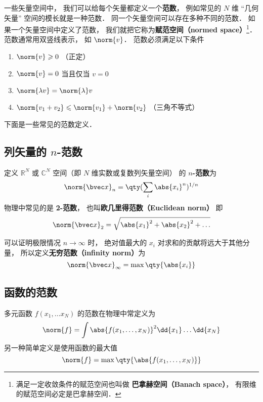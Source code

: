 

一些矢量空间中， 我们可以给每个矢量都定义一个\textbf{范数}， 例如常见的 $N$ 维 “几何矢量” 空间的模长就是一种范数． 同一个矢量空间可以存在多种不同的范数． 如果一个矢量空间中定义了范数， 我们就把它称为\textbf{赋范空间（normed space）}\footnote{满足一定收敛条件的赋范空间也叫做 \textbf{巴拿赫空间（Banach space）}， 有限维的赋范空间必定是巴拿赫空间．%
}． 范数通常用双竖线表示， 如 $\norm{v}$． 范数必须满足以下条件

\begin{enumerate}
\item $\norm{v} \geqslant 0$ （正定）
\item $\norm{v} = 0$ 当且仅当 $v = 0$
\item $\norm{\lambda v} = \norm{\lambda} v$
\item $\norm{v_1 + v_2} \leqslant \norm{v_1} + \norm{v_2}$ （三角不等式）

\end{enumerate}

下面是一些常见的范数定义．

\subsection{列矢量的 $n$-范数}
定义 $\mathbb R^N$ 或 $\mathbb C^N$ 空间（即 $N$ 维实数或复数列矢量空间） 的 \textbf{$n$-范数}为
\begin{equation}
\norm{\bvec x}_n = \qty(\sum_i \abs{x_i}^n)^{1/n}
\end{equation}
物理中常见的是 \textbf{2-范数}， 也叫\textbf{欧几里得范数（Euclidean norm）} 即
\begin{equation}
\norm{\bvec x}_2 = \sqrt{\abs{x_1}^2 + \abs{x_2}^2 + \dots}
\end{equation}

可以证明极限情况 $n \to \infty$ 时， 绝对值最大的 $x_i$ 对求和的贡献将远大于其他分量， 所以定义\textbf{无穷范数（infinity norm）}为
\begin{equation}
\norm{\bvec x}_\infty = \max \qty{\abs{x_i}}
\end{equation}

\subsection{函数的范数}
多元函数 $f(x_1, \dots x_N)$ 的范数在物理中常定义为
\begin{equation}
\norm{f} = \int \abs{f(x_1, \dots, x_N)}^2 \dd{x_1}\dots \dd{x_N}
\end{equation}
另一种简单定义是使用函数的最大值
\begin{equation}
\norm{f} = \max\qty{\abs{f(x_1, \dots, x_N)}}
\end{equation}
